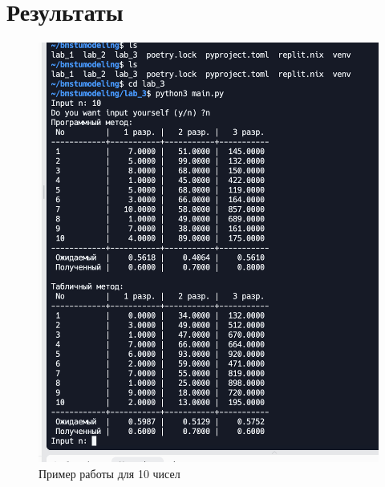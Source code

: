 \documentclass[a4paper, 12pt]{article}
\begin{document}
\section{{Результаты}}
\begin{figure}[h!]
	\centering \includegraphics[scale=0.7]{10}
	\centering\caption{Пример работы для 10 чисел}
\end{figure}
\clearpage
\newpage
\end{document}
